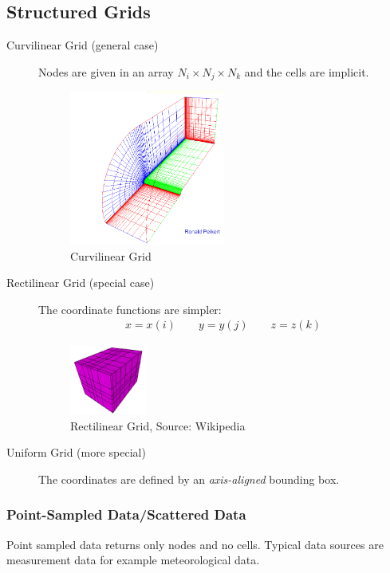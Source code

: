\subsection{Structured Grids}
\begin{description}
    \item[Curvilinear Grid (general case)] Nodes are given in an array $N_i\times N_j\times N_k$ and the cells are implicit.
    \begin{figure}[H]
        \centering
        \includegraphics[width=0.5\textwidth]{img/01_curvilinear_grid}
        \caption{Curvilinear Grid}
    \end{figure}

    \item[Rectilinear Grid (special case)] The coordinate functions are simpler:
        \begin{align*}
            x = x(i)\qquad
            y = y(j)\qquad
            z = z(k)
        \end{align*}
        \begin{figure}[H]
            \centering
            \includegraphics[width=0.25\textwidth]{img/01_rectilinear_grid_wikipedia}
            \caption{Rectilinear Grid, Source: Wikipedia}
        \end{figure}

     \item[Uniform Grid (more special)] The coordinates are defined by an \emph{axis-aligned} bounding box.
\end{description}

\subsubsection{Point-Sampled Data/Scattered Data}
Point sampled data  returns only nodes and no cells. Typical data sources are measurement data for example meteorological data.

